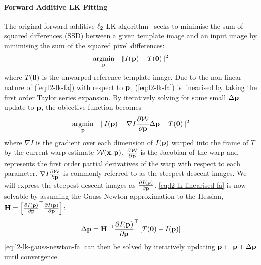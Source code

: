 \paragraph{Forward Additive LK Fitting}\label{subsubsec:lk-fa}
The original forward additive $\ell_2$ LK
algorithm~\cite{RefWorks:71,RefWorks:10} seeks to minimise the sum of squared
differences (SSD) between a given template image and an input image by
minimising the sum of the squared pixel differences:
\begin{equation}\label{eq:l2-lk-fa}
    \argmin_{\p} \quad \norm{I(\p) - T(\zero)}^2
\end{equation}
where $T(\boldsymbol{\mathbf{0}})$ is the unwarped reference template image. Due to the non-linear
nature of (\ref{eq:l2-lk-fa}) with respect to $\boldsymbol{\mathbf{p}}$, (\ref{eq:l2-lk-fa}) is
linearised by taking the first order Taylor series expansion. By iteratively
solving for some small $\Delta \boldsymbol{\mathbf{p}}$ update to $\boldsymbol{\mathbf{p}}$, the objective function
becomes
\begin{equation}\label{eq:l2-lk-linearised-fa}
    \argmin_{\p} \quad \norm{I(\p) + \nabla I \frac{\partial \mathcal{W}}{\partial \p} \Delta \p - T(\zero)}^2
\end{equation}
where $\nabla I$ is the gradient over each dimension of $I(\boldsymbol{\mathbf{p}})$ warped into the
frame of $T$ by the current warp estimate $\mathcal{W}(\boldsymbol{\mathbf{x}};\boldsymbol{\mathbf{p}})$.
$\frac{\partial \mathcal{W}}{\partial \boldsymbol{\mathbf{p}}}$ is the Jacobian of the warp and
represents the first order partial derivatives of the warp with respect to each
parameter. $\nabla I \frac{\partial \mathcal{W}}{\partial \boldsymbol{\mathbf{p}}}$ is commonly
referred to as the steepest descent images. We will express the steepest descent
images as $\frac{\partial I(\boldsymbol{\mathbf{p}})}{\partial \boldsymbol{\mathbf{p}}}$. 
\cref{eq:l2-lk-linearised-fa} is now solvable by assuming the 
Gauss-Newton approximation to the Hessian,
$\boldsymbol{\mathbf{H}} = \left[ {\frac{\partial I(\boldsymbol{\mathbf{p}})}{\partial \boldsymbol{\mathbf{p}}}}^{\top} \frac{\partial I(\boldsymbol{\mathbf{p}})}{\partial \boldsymbol{\mathbf{p}}} \right]$:
\begin{equation}\label{eq:l2-lk-gauss-newton-fa}
    \Delta \boldsymbol{\mathbf{p}} = \boldsymbol{\mathbf{H}}^{-1} \frac{\partial I(\boldsymbol{\mathbf{p}})}{\partial \boldsymbol{\mathbf{p}}}^{\top} \left[ T(\boldsymbol{\mathbf{0}}) - I(\boldsymbol{\mathbf{p}}) \right]
\end{equation}
\cref{eq:l2-lk-gauss-newton-fa} can then be solved by iteratively
updating $\boldsymbol{\mathbf{p}} \leftarrow \boldsymbol{\mathbf{p}} + \Delta \boldsymbol{\mathbf{p}}$ until convergence.
